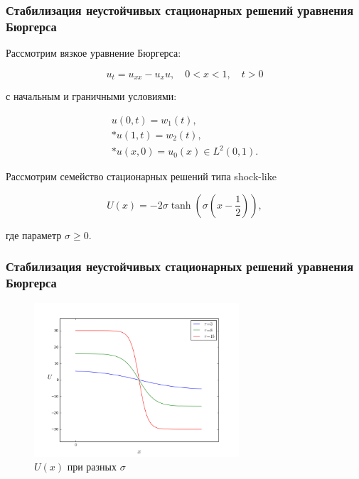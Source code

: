\documentclass{beamer}
\begin{document}
\begin{frame}
\frametitle{Стабилизация неустойчивых стационарных решений уравнения Бюргерса}

Рассмотрим вязкое уравнение Бюргерса:
\begin{block}{}
\begin{equation}\label{burger}
  u_t = u_{xx} - u_x u, \quad 0 < x < 1, \quad t > 0
\end{equation}
\end{block}
с начальным и граничными условиями:
\begin{block}{}
\begin{gather}\label{cond}
  u(0, t) = w_1(t), \\*
  u(1, t) = w_2(t), \\*
  u(x, 0) = u_{0}(x) \in L^2(0, 1). \nonumber
\end{gather}
\end{block}

Рассмотрим семейство стационарных решений типа shock-like

\begin{block}{}
\begin{equation}\label{shock_like}
  U(x) = -2\sigma\tanh{(\sigma(x - \frac{1}{2}))},
\end{equation}
\end{block}
где параметр $\sigma \ge 0$.

\end{frame}

\begin{frame}
\frametitle{Стабилизация неустойчивых стационарных решений уравнения Бюргерса}
\begin{figure}[H]
  \centering
  \includegraphics[width=3in]{fig1}
  \caption{$U(x)$ при разных $\sigma$}
\end{figure}
\end{frame}
\end{document}

